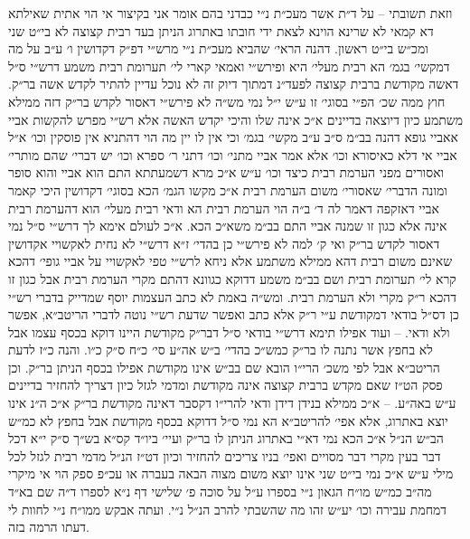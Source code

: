 \documentclass[12pt, openany]{book}
\begin{document}
\begin{multicols}{2}
וזאת תשובתי – על ד״ת אשר מעכ״ת נ״י כבדני בהם אומר אני בקיצור אי הוי אתית שאילתא דא קמאי לא שרינא הוינא לצאת ידי חובתו באתרוג הניתן בעד רבית קצוצה לא בי״ט שני ומכ״ש בי״ט ראשון. דהנה הראי׳ שהביא מעכ״ת נ״י מרש״י דפ״ק דקדושין ו׳ ע״ב על מה דמקשי׳ בגמ׳ הא רבית מעלי׳ היא ופירש״י ואמאי קארי לי׳ תערומת רבית משמע דרש״י ס״ל דאשה מקודשת ברבית קצוצה לפעד״נ דמתוך דיוק זה לא נוכל עדיין להתיר לקדש אשה בר״ק. חוץ ממה שכ׳ הפ״י בסוגי׳ זו ע״ש י״ל נמי מש״ה לא פירש״י דאסור לקדש בר״ק דזה ממילא משתמע כיון דיוצאה בדיינים א״כ אינה שלו והיכי יקדש האשה אלא רש״י מפרש להקשות אביי אאביי גופא דהנה בב״מ ס״ב ע״ב מקשי׳ בגמ׳ וכי אין לו יין מה הוי דהתניא אין פוסקין וכו׳ א״ל אביי אי דלא כאיסורא וכו׳ אלא אמר אביי מתני׳ וכו׳ דתני ר׳ ספרא וכו׳ יש דברי׳ שהם מותרי׳ ואסורים מפני הערמת רבית כיצד וכו׳ ע״ש א״כ מרא דשמעתתא התם הוא אביי והוא סופר ומונה הדברי׳ שאסורי׳ משום הערמת רבית א״כ מקשו הגמ׳ הכא בסוגי׳ דקדושין היכי קאמר אביי דאזקפה דאמר לה ד׳ ב״ה הוי הערמת רבית הא ודאי רבית מעלי׳ הוא דהערמת רבית אינה אלא כגון זו שמנה אביי התם בב״מ משא״כ הכא. א״כ לעולם אימא לך דרש״י ס״ל נמי דאסור לקדש בר״ק ואי ק׳ למה לא פירש״י כן בהדי׳ ז״א דרש״י לא נחית לאקשויי אקדושין שאינם משום רבית דהא ממילא משתמע אלא ניחא לרש״י טפי לאקשויי על אביי גופי׳ דהכא קרא לי׳ תערומת רבית ושם בב״מ משמע דדוקא כגוונא דהתם מקרי הערמת רבית אבל כגון זו דהכא ר״ק מקרי ולא הערמת רבית. ומש״ה באמת לא כתב העצמות יוסף שמדייק בדברי רש״י כן דס״ל בודאי דמקודשת ע״י ר״ק אלא כתב ואפשר שדעת רש״י נוטה לדברי הריטב״א, אפשר ולא ודאי. – ועוד אפילו תימא דרש״י בודאי ס״ל דבר״ק מקודשת היינו דוקא בכסף עצמו אבל לא בחפץ אשר נתנה לו בר״ק כמש״כ בהדי׳ ב״ש אה״ע סי׳ כ״ח ס״ק כ״ו. והנה כ״ז לדעת הריטב״א אבל לפי משכ׳ הרי״ו הובא שם בב״ש אינו מקודשת אפילו בכסף הניתן בר״ק. וכן פסק הט״ז שאם מקדש ברבית קצוצה אינה מקודשת ומדמי לגזל כיון דצריך להחזיר בדיינים ע״ש באה״ע. – א״כ ממילא בנידן דידן ודאי להרי״ו דקסבר דאינה מקודשת בר״ק א״כ ה״נ אינו יוצא באתרוג, אלא אפי׳ להריטב״א הא נמי ס״ל דדוקא בכסף מקודשת אבל בחפץ לא כמ״ש הב״ש הנ״ל א״כ הכא נמי דא״י באתרוג הניתן לו בר״ק ועיי׳ ביו״ד קס״א בש״ך ס״ק י״א דכל דבר בעין מקרי דבר מסויים ואפי׳ בניו צריכים להחזיר וכיון דט״ז הנ״ל מדמי רבית לגזל לכל מילי ע״ש א״כ נמי בי״ט שני אינו יוצא משום מצוה הבאה בעברה או עכ״פ ספק הוי אי מיקרי מה״ב כמ״ש מו״ח הגאון נ״י בספרו ע״ל על סוכה פ׳ שלישי דף נ״א לספרו ד״ה שם בא״ד דמחמת עבירה וכו׳ יע״ש זהו מה שהשבתי להרב הנ״ל נ״י. ועתה אבקש ממו״ח נ״י לחוות לי דעתו הרמה בזה.\\\vspace{0pt}


\end{multicols}
\end{document}
